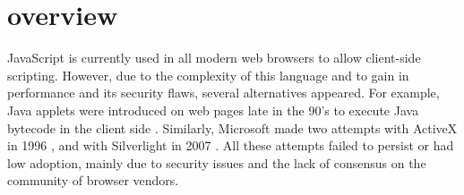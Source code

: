 \section{\wasm overview}
\label{sota:wasm}

\newcommand{\lstnumberautorefname}{Line}
\newcommand{\lineref}[1]{\autoref{#1}}




JavaScript is currently used in all modern web browsers to allow client-side scripting. However, due to the complexity of this language and to gain in performance and its security flaws, several alternatives appeared.  For example, Java applets were introduced on web pages late in the 90's to execute Java bytecode in the client side \cite{javaapplet}. Similarly, Microsoft made two attempts with ActiveX in 1996 \cite{activex}, and with Silverlight in 2007 \cite{silverlight}. All these attempts failed to persist or had low adoption, mainly due to security issues and the lack of consensus on the community of browser vendors.

